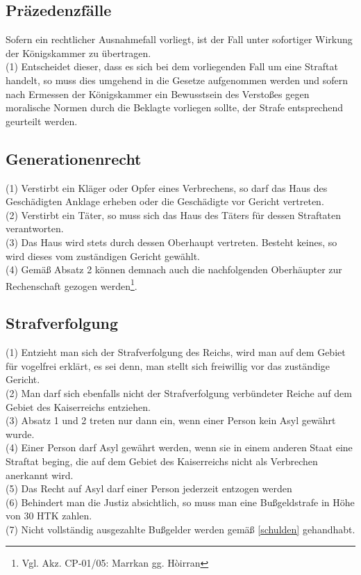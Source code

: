 \documentclass{article}
\begin{document}
\subsection{Präzedenzfälle}
Sofern ein rechtlicher Ausnahmefall vorliegt, ist der Fall unter sofortiger Wirkung der Königskammer zu übertragen.\\
(1) Entscheidet dieser, dass es sich bei dem vorliegenden Fall um eine Straftat handelt, so muss dies umgehend in die Gesetze aufgenommen werden und
sofern nach Ermessen der Königskammer ein Bewusstsein des Verstoßes gegen moralische Normen durch die Beklagte vorliegen sollte, der Strafe entsprechend
geurteilt werden.

\subsection{Generationenrecht}
(1) Verstirbt ein Kläger oder Opfer eines Verbrechens, so darf das Haus des Geschädigten Anklage erheben oder die Geschädigte vor Gericht vertreten.\\
(2) Verstirbt ein Täter, so muss sich das Haus des Täters für dessen Straftaten verantworten.\\
(3) Das Haus wird stets durch dessen Oberhaupt vertreten. Besteht keines, so wird dieses vom zuständigen Gericht gewählt.\\
(4) Gemäß Absatz 2 können demnach auch die nachfolgenden Oberhäupter zur Rechenschaft gezogen werden\footnote{Vgl. Akz. CP-01/05: Marrkan gg. Hòirran}.

\subsection{Strafverfolgung}
(1) Entzieht man sich der Strafverfolgung des Reichs, wird man auf dem Gebiet für vogelfrei erklärt, es sei denn, man stellt sich freiwillig vor das zuständige Gericht.\\
(2) Man darf sich ebenfalls nicht der Strafverfolgung verbündeter Reiche auf dem Gebiet des Kaiserreichs entziehen.\\
(3) Absatz 1 und 2 treten nur dann ein, wenn einer Person kein Asyl gewährt wurde.\\
(4) Einer Person darf Asyl gewährt werden, wenn sie in einem anderen Staat eine Straftat beging, die auf dem Gebiet des Kaiserreichs nicht als Verbrechen anerkannt wird.\\
(5) Das Recht auf Asyl darf einer Person jederzeit entzogen werden\\
(6) Behindert man die Justiz absichtlich, so muss man eine Bußgeldstrafe in Höhe von 30 HTK zahlen.\\
(7) Nicht vollständig ausgezahlte Bußgelder werden gemäß \ref{schulden} gehandhabt.
\end{document}
